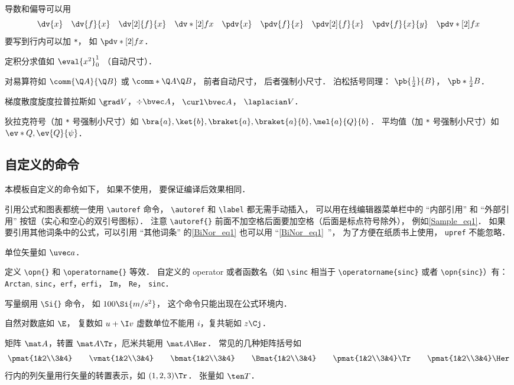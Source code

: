 导数和偏导可以用
\begin{equation}
\dv{x} \quad \dv{f}{x} \quad \dv[2]{f}{x} \quad \dv*[2]{f}{x} \quad
\pdv{x} \quad \pdv{f}{x} \quad \pdv[2]{f}{x} \quad \pdv{f}{x}{y} \quad \pdv*[2]{f}{x}
\end{equation}
要写到行内可以加 \verb|*|， 如 $\pdv*[2]{f}{x}$．

定积分求值如 $\eval{x^2}_0^1$ （自动尺寸）．

对易算符如 $\comm{\Q A}{\Q B}$ 或 $\comm*{\Q A}{\Q B}$， 前者自动尺寸， 后者强制小尺寸． 泊松括号同理： $\pb{\frac12}{B}$， $\pb*{\frac12}{B}$．

梯度散度旋度拉普拉斯如 $\grad V$，$\div\bvec A$， $\curl\bvec A$， $\laplacian V$．

狄拉克符号（加 \verb|*| 号强制小尺寸）如 $\bra{a}, \ket{b}, \braket{a}, \braket{a}{b}, \mel{a}{Q}{b}$． 平均值（加 \verb|*| 号强制小尺寸）如 $\ev*{Q}, \ev{Q}{\psi}$．

\subsection{自定义的命令}
本模板自定义的命令如下， 如果不使用， 要保证编译后效果相同．

引用公式和图表都统一使用 \verb|\autoref| 命令， \verb|\autoref| 和 \verb|\label| 都无需手动插入， 可以用在线编辑器菜单栏中的 “内部引用” 和 “外部引用” 按钮（实心和空心的双引号图标）． 注意 \verb|\autoref{}| 前面不加空格后面要加空格（后面是标点符号除外）， 例如\autoref{Sample_eq1}． 如果要引用其他词条中的公式，可以引用 “其他词条” 的\autoref{BiNor_eq1} 也可以用 “\autoref{BiNor_eq1}~”， 为了方便在纸质书上使用， \verb|upref| 不能忽略．

单位矢量如 $\uvec a$．

定义 \verb|\opn{}| 和 \verb|\operatorname{}| 等效． 自定义的 operator 或者函数名（如 \verb|\sinc| 相当于 \verb|\operatorname{sinc}| 或者 \verb|\opn{sinc}|）有： \verb|Arctan|, \verb|sinc|，\verb|erf|，\verb|erfi|， \verb|Im|， \verb|Re|， \verb|sinc|．

写量纲用 \verb|\Si{}| 命令， 如 $100\Si{m/s^2}$， 这个命令只能出现在公式环境内．
 
自然对数底如 $\E$， 复数如 $u+\I v$ 虚数单位不能用 $i$，复共轭如 $z\Cj$．

矩阵 $\mat A$，转置 $\mat A \Tr$，厄米共轭用 $\mat A \Her$． 常见的几种矩阵括号如
\begin{equation}
\pmat{1&2\\3&4} \qquad
\vmat{1&2\\3&4} \qquad 
\bmat{1&2\\3&4} \qquad
\Bmat{1&2\\3&4} \qquad
\pmat{1&2\\3&4}\Tr \qquad
\pmat{1&2\\3&4}\Her
\end{equation}
行内的列矢量用行矢量的转置表示，如 $(1,2,3)\Tr$． 张量如 $\ten T$．

